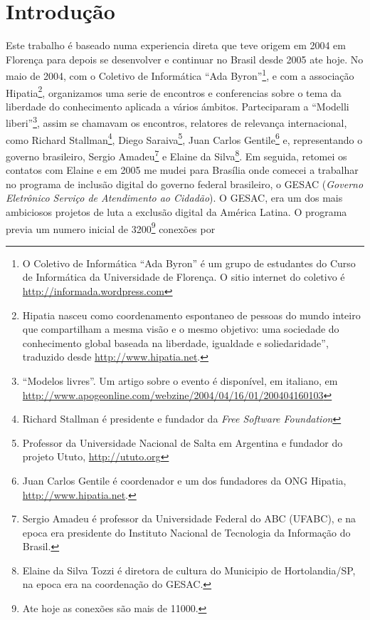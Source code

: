 
\chapter{Introdução}
\label{Capitulo1}


Este trabalho é baseado numa experiencia direta que teve origem em
2004 em Florença para depois se desenvolver e continuar no Brasil
desde 2005 ate hoje. No maio de 2004, com o Coletivo de Informática
``Ada Byron''\footnote{O Coletivo de Informática ``Ada Byron'' é um
  grupo de estudantes do Curso de Informática da Universidade de
  Florença. O sitio internet do coletivo é
  \url{http://informada.wordpress.com}}, e com a associação
Hipatia\footnote{Hipatia nasceu como coordenamento espontaneo de
  pessoas do mundo inteiro que compartilham a mesma visão e o mesmo
  objetivo: uma sociedade do conhecimento global baseada na liberdade,
  igualdade e soliedaridade'', traduzido desde
  \url{http://www.hipatia.net}.}, organizamos uma serie de encontros e
conferencias sobre o tema da liberdade do conhecimento aplicada a
vários ámbitos. Parteciparam a ``Modelli liberi''\footnote{``Modelos
  livres''. Um artigo sobre o evento é disponível, em italiano, em
  \url{http://www.apogeonline.com/webzine/2004/04/16/01/200404160103}},
assim se chamavam os encontros, relatores de relevança internacional,
como Richard Stallman\footnote{Richard Stallman é presidente e
  fundador da \emph{Free Software Foundation}}, Diego
Saraiva\footnote{Professor da Universidade Nacional de Salta em
  Argentina e fundador do projeto Ututo, \url{http://ututo.org}}, Juan
Carlos Gentile\footnote{Juan Carlos Gentile é coordenador e um dos
  fundadores da ONG Hipatia, \url{http://www.hipatia.net}.} e,
representando o governo brasileiro, Sergio Amadeu\footnote{Sergio
  Amadeu é professor da Universidade Federal do ABC (UFABC), e na
  epoca era presidente do Instituto Nacional de Tecnologia da
  Informação do Brasil.} e Elaine da Silva\footnote{Elaine da Silva
  Tozzi é diretora de cultura do Municipio de Hortolandia/SP, na epoca
  era na coordenação do GESAC.}. Em seguida, retomei os contatos com
Elaine e em 2005 me mudei para Brasília onde comecei a trabalhar no
programa de inclusão digital do governo federal brasileiro, o GESAC
(\emph{Governo Eletrônico Serviço de Atendimento ao Cidadão}). O
GESAC, era um dos mais ambiciosos projetos de luta a exclusão digital
da América Latina. O programa previa um numero inicial de
3200\footnote{Ate hoje as conexões são mais de 11000.} conexões por
